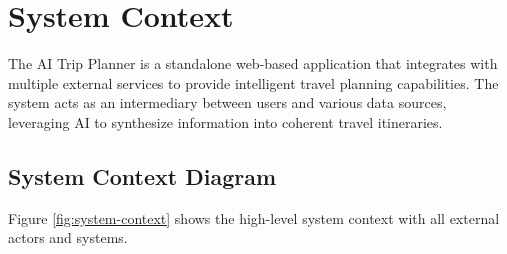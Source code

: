 \documentclass[12pt,a4paper]{report}
\begin{document}
\section{System Context}

The AI Trip Planner is a standalone web-based application that integrates with multiple external services to provide intelligent travel planning capabilities. The system acts as an intermediary between users and various data sources, leveraging AI to synthesize information into coherent travel itineraries.

\subsection{System Context Diagram}

Figure \ref{fig:system-context} shows the high-level system context with all external actors and systems.
\end{document}
